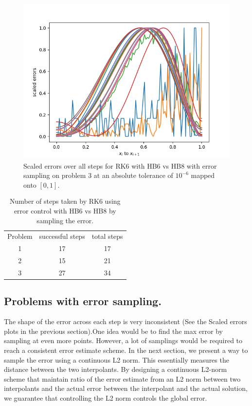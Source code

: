 \begin{figure}[H]
\centering
\includegraphics[width=0.7\linewidth]{./figures/rk6_with_hb6_hb8_sampling_p3_scaled_errors}
\caption{Scaled errors over all steps for RK6 with HB6 vs HB8 with error sampling on problem 3 at an absolute tolerance of $10^{-6}$ mapped onto $[0, 1]$.}
\label{fig:rk6_with_hb6_hb8_sampling_p3_scaled_errors}
\end{figure}

\begin{table}[h]
\caption {Number of steps taken by RK6 using error control with HB6 vs HB8 by sampling the error.} \label{tab:rk6_with_hb6_hb8_sampling_nsteps}
\begin{center}
\begin{tabular}{ c c c } 
Problem & successful steps & total steps \\ 
1       & 17                         & 17 \\ 
2       & 15                         & 21 \\
3       & 27                         & 34 \\
\end{tabular}
\end{center}
\end{table}

\subsection{Problems with error sampling.}
The shape of the error across each step is very inconsistent (See the Scaled errors plots in the previous section).One idea would be to find the max error by sampling at even more points. However, a lot of samplings would be required to reach a consistent error estimate scheme. In the next section, we present a way to sample the error using a continuous L2 norm. This essentially measures the distance between the two interpolants. By designing a continuous L2-norm scheme that maintain ratio of the error estimate from an L2 norm between two interpolants and the actual error between the interpolant and the actual solution, we guarantee that controlling the L2 norm controls the global error.

